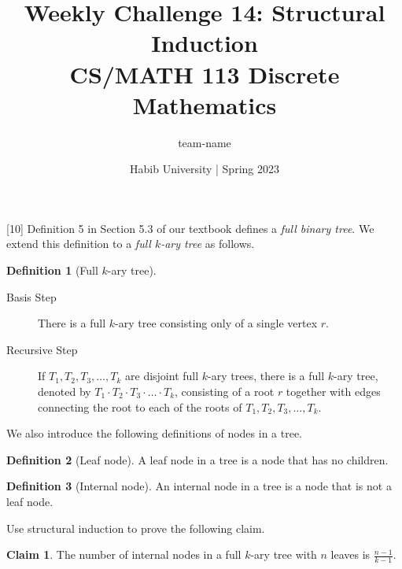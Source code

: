\documentclass[a4paper,addpoints]{exam}
\title{Weekly Challenge 14: Structural Induction\\CS/MATH 113 Discrete Mathematics}
\author{team-name}  %
\date{Habib University | Spring 2023}
\theoremstyle{definition}
\newtheorem{definition}{Definition}
\theoremstyle{claim}
\newtheorem{claim}{Claim}
\begin{document}
\maketitle

\begin{questions}

[10]
  Definition 5 in Section 5.3 of our textbook defines a \textit{full binary tree}. We extend this definition to a \textit{full $k$-ary tree} as follows.
  \begin{framed}
    \begin{definition}[Full $k$-ary tree]
      \begin{description}
      \item[Basis Step] There is a full $k$-ary tree consisting only of a single vertex $r$.
      \item[Recursive Step]  If $T_1,T_2, T_3,\ldots,T_k$ are disjoint full $k$-ary trees, there is a full $k$-ary tree, denoted by $T_1\cdot T_2\cdot T_3\cdot\ldots\cdot T_k$, consisting of a root $r$ together with edges connecting the root to each of the roots of $T_1,T_2, T_3,\ldots,T_k$.
      \end{description}
    \end{definition}
  \end{framed}
  We also introduce the following definitions of nodes in a tree.
  \begin{definition}[Leaf node]
    A leaf node in a tree is a node that has no children.
  \end{definition}
  \begin{definition}[Internal node]
    An internal node in a tree is a node that is not a leaf node.
  \end{definition}

  Use structural induction to prove the following claim.
  \begin{claim}
    The number of internal nodes in a full $k$-ary tree with $n$ leaves is $\frac{n-1}{k-1}$.
  \end{claim}

  \begin{solution}
  \end{solution}

\end{questions}
\end{document}
